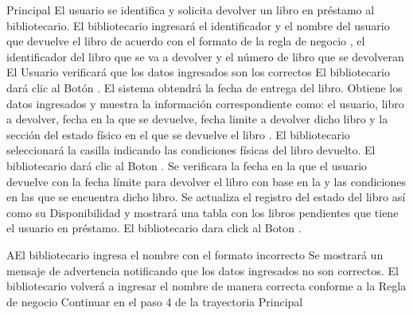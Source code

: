 	\begin{UCtrayectoria}{Principal}
		\UCpaso[\UCactor] El usuario se identifica y solicita devolver un libro en préstamo al bibliotecario.  
		\UCpaso[\UCactor] El bibliotecario ingresará el identificador y el nombre del usuario que devuelve el libro de acuerdo con el formato de la regla de negocio , el identificador del libro que se va a devolver y el número de libro que se devolveran 
		\UCpaso[\UCactor] El Usuario verificará que los datos ingresados son los correctos
		\UCpaso[\UCactor] El bibliotecario dará clic al Botón .
		\UCpaso[\UCsist] El sistema obtendrá la fecha de entrega del libro.
				\UCpaso[\UCsist] Obtiene los datos ingresados y muestra la información correspondiente como: el usuario, libro a devolver, fecha en la que se devuelve, fecha limite a devolver dicho libro y la sección del estado físico en el que se devuelve el libro .
\UCpaso[\UCactor] El bibliotecario seleccionará la casilla indicando las condiciones físicas del libro devuelto.						
						\UCpaso[\UCactor] El bibliotecario dará clic al Boton  .
		\UCpaso[\UCsist] Se verificara la fecha en la que el usuario devuelve con la fecha límite para devolver el libro con base en la  y las condiciones en las que se encuentra dicho libro. 
				\UCpaso[\UCsist] Se actualiza el registro del estado del libro así como su Disponibilidad y mostrará una tabla con los libros pendientes que tiene el usuario en préstamo.   
	\UCpaso[\UCactor] El bibliotecario dara click al Boton .
	\end{UCtrayectoria}
				\begin{UCtrayectoriaA}{A}{El bibliotecario ingresa el nombre con el formato incorrecto}
			\UCpaso[\UCsist] Se mostrará un mensaje de advertencia notificando que los datos ingresados no son correctos. 
			\UCpaso[\UCactor] El bibliotecario volverá a ingresar el nombre de manera correcta conforme a la Regla de negocio  
			\UCpaso[\UCsist]Continuar en el paso 4 de la trayectoria Principal
		\end{UCtrayectoriaA}


